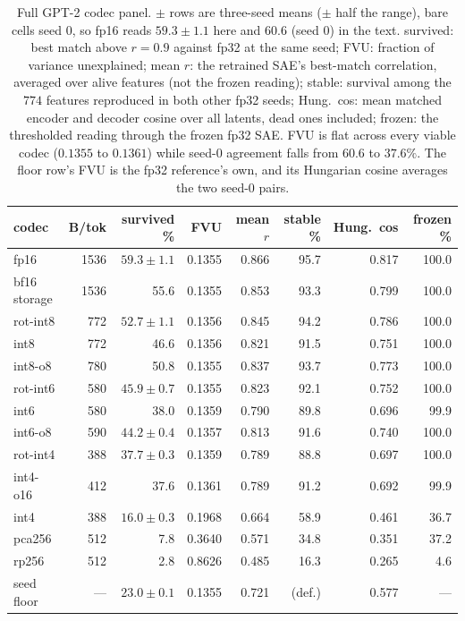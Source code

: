 \begin{table}[htbp]
\caption{Full GPT-2 codec panel. $\pm$ rows are three-seed means ($\pm$ half the range), bare cells seed 0, so fp16 reads $59.3 \pm 1.1$ here and $60.6$ (seed 0) in the text. survived: best match above $r = 0.9$ against fp32 at the same seed; FVU: fraction of variance unexplained; mean $r$: the retrained SAE's best-match correlation, averaged over alive features (not the frozen reading); stable: survival among the $774$ features reproduced in both other fp32 seeds; Hung.\ cos: mean matched encoder and decoder cosine over all latents, dead ones included; frozen: the thresholded reading through the frozen fp32 SAE. FVU is flat across every viable codec ($0.1355$ to $0.1361$) while seed-0 agreement falls from $60.6$ to $37.6\%$. The floor row's FVU is the fp32 reference's own, and its Hungarian cosine averages the two seed-0 pairs.}
\label{tab:m1full}
\centering\footnotesize
\begin{tabular}{lrrrrrrr}
\toprule
codec & B/tok & survived \% & FVU & mean $r$ & stable \% & Hung.\ cos & frozen \% \\
\midrule
fp16 & 1536 & $59.3 \pm 1.1$ & 0.1355 & 0.866 & 95.7 & 0.817 & 100.0 \\
bf16 storage & 1536 & 55.6 & 0.1355 & 0.853 & 93.3 & 0.799 & 100.0 \\
rot-int8 & 772 & $52.7 \pm 1.1$ & 0.1356 & 0.845 & 94.2 & 0.786 & 100.0 \\
int8 & 772 & 46.6 & 0.1356 & 0.821 & 91.5 & 0.751 & 100.0 \\
int8-o8 & 780 & 50.8 & 0.1355 & 0.837 & 93.7 & 0.773 & 100.0 \\
rot-int6 & 580 & $45.9 \pm 0.7$ & 0.1355 & 0.823 & 92.1 & 0.752 & 100.0 \\
int6 & 580 & 38.0 & 0.1359 & 0.790 & 89.8 & 0.696 & 99.9 \\
int6-o8 & 590 & $44.2 \pm 0.4$ & 0.1357 & 0.813 & 91.6 & 0.740 & 100.0 \\
rot-int4 & 388 & $37.7 \pm 0.3$ & 0.1359 & 0.789 & 88.8 & 0.697 & 100.0 \\
int4-o16 & 412 & 37.6 & 0.1361 & 0.789 & 91.2 & 0.692 & 99.9 \\
int4 & 388 & $16.0 \pm 0.3$ & 0.1968 & 0.664 & 58.9 & 0.461 & 36.7 \\
pca256 & 512 & 7.8 & 0.3640 & 0.571 & 34.8 & 0.351 & 37.2 \\
rp256 & 512 & 2.8 & 0.8626 & 0.485 & 16.3 & 0.265 & 4.6 \\
\midrule
seed floor & --- & $23.0 \pm 0.1$ & 0.1355 & 0.721 & (def.) & 0.577 & --- \\
\bottomrule
\end{tabular}
\end{table}

